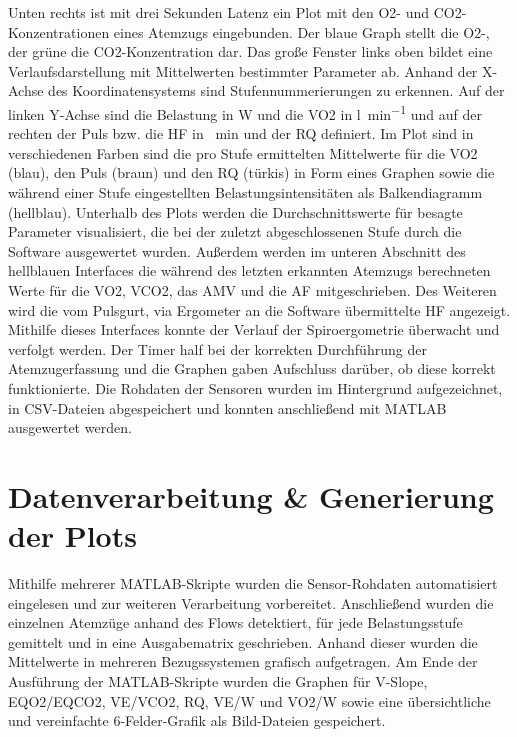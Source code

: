 Unten rechts ist mit drei Sekunden Latenz ein Plot mit den \acs{O2}- und \acs{CO2}-Konzentrationen eines Atemzugs eingebunden. Der blaue Graph stellt die \acs{O2}-, der grüne die \acs{CO2}-Konzentration dar. Das große Fenster links oben bildet eine Verlaufsdarstellung mit Mittelwerten bestimmter Parameter ab. Anhand der X-Achse des Koordinatensystems sind Stufennummerierungen zu erkennen. Auf der linken Y-Achse sind die Belastung in \si{\watt} und die \acs{VO2} in \si{\litre\per\minute} und auf der rechten der Puls bzw. die \acs{HF} in \si{\per\minute} und der \acs{RQ} definiert. Im Plot sind in verschiedenen Farben sind die pro Stufe ermittelten Mittelwerte für die \acs{VO2} (blau), den Puls (braun) und den \acs{RQ} (türkis) in Form eines Graphen sowie die während einer Stufe eingestellten Belastungsintensitäten als Balkendiagramm (hellblau). Unterhalb des Plots werden die Durchschnittswerte für besagte Parameter visualisiert, die bei der zuletzt abgeschlossenen Stufe durch die Software ausgewertet wurden. Außerdem werden im unteren Abschnitt des hellblauen Interfaces die während des letzten erkannten Atemzugs berechneten Werte für die \ac{VO2}, \ac{VCO2}, das \ac{AMV} und die \ac{AF} mitgeschrieben. Des Weiteren wird die vom Pulsgurt, via Ergometer an die Software übermittelte \ac{HF} angezeigt. Mithilfe dieses Interfaces konnte der Verlauf der Spiroergometrie überwacht und verfolgt werden. Der Timer half bei der korrekten Durchführung der Atemzugerfassung und die Graphen gaben Aufschluss darüber, ob diese korrekt funktionierte. Die Rohdaten der Sensoren wurden im Hintergrund aufgezeichnet, in \acs{CSV}-Dateien abgespeichert und konnten anschließend mit MATLAB ausgewertet werden.
%
\section{Datenverarbeitung \& Generierung der Plots}
%
Mithilfe mehrerer MATLAB-Skripte wurden die Sensor-Rohdaten automatisiert eingelesen und zur weiteren Verarbeitung vorbereitet. Anschließend wurden die einzelnen Atemzüge anhand des Flows detektiert, für jede Belastungsstufe gemittelt und in eine Ausgabematrix geschrieben. Anhand dieser wurden die Mittelwerte in mehreren Bezugssystemen grafisch aufgetragen. Am Ende der Ausführung der MATLAB-Skripte wurden die Graphen für V-Slope, \acs{EQO2}/\acs{EQCO2}, \acs{VE}/\acs{VCO2}, \acs{RQ}, \acs{VE}/\acs{W} und \acs{VO2}/\acs{W} sowie eine übersichtliche und vereinfachte 6-Felder-Grafik als Bild-Dateien gespeichert. 
%
